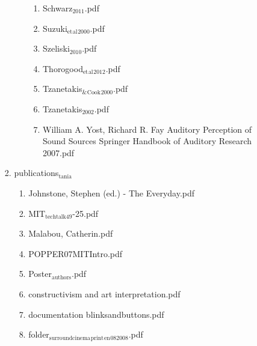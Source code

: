 \documentclass[11pt]{article}
\begin{document}
\begin{enumerate}
\begin{enumerate}
\begin{enumerate}
\begin{enumerate}
\begin{enumerate}
\item Schwarz$_{\text{2011}}$.pdf
\label{sec-1-1-1-1-7-2-1-32}

\item Suzuki$_{\text{et}}$$_{\text{al}}$$_{\text{2000}}$.pdf
\label{sec-1-1-1-1-7-2-1-33}

\item Szeliski$_{\text{2010}}$.pdf
\label{sec-1-1-1-1-7-2-1-34}

\item Thorogood$_{\text{et}}$$_{\text{al}}$$_{\text{2012}}$.pdf
\label{sec-1-1-1-1-7-2-1-35}

\item Tzanetakis$_{\text{\&}}$$_{\text{Cook}}$$_{\text{2000}}$.pdf
\label{sec-1-1-1-1-7-2-1-36}

\item Tzanetakis$_{\text{2002}}$.pdf
\label{sec-1-1-1-1-7-2-1-37}

\item William A. Yost, Richard R. Fay Auditory Perception of Sound Sources Springer Handbook of Auditory Research  2007.pdf
\label{sec-1-1-1-1-7-2-1-38}
\end{enumerate}
\end{enumerate}

\item publications$_{\text{tania}}$
\label{sec-1-1-1-1-7-3}
\begin{enumerate}
\item Johnstone, Stephen (ed.) - The Everyday.pdf
\label{sec-1-1-1-1-7-3-1}

\item MIT$_{\text{techtalk49}}$-25.pdf
\label{sec-1-1-1-1-7-3-2}

\item Malabou, Catherin.pdf
\label{sec-1-1-1-1-7-3-3}

\item POPPER07MITIntro.pdf
\label{sec-1-1-1-1-7-3-4}

\item Poster$_{\text{authors}}$.pdf
\label{sec-1-1-1-1-7-3-5}

\item constructivism and art interpretation.pdf
\label{sec-1-1-1-1-7-3-6}

\item documentation blinksandbuttons.pdf
\label{sec-1-1-1-1-7-3-7}

\item folder$_{\text{surroundcinema}}$$_{\text{print}}$$_{\text{en}}$$_{\text{082008}}$.pdf
\label{sec-1-1-1-1-7-3-8}


\end{enumerate}
\end{enumerate}
\end{enumerate}
\end{enumerate}
\end{document}
